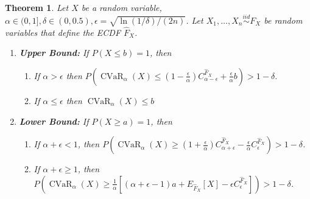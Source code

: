 \documentclass[acmlarge, manuscript, screen, review, natbib=false, oneside]{acmart}
\newtheorem{theorem}{Theorem}[section]
\DeclareMathOperator{\CVaR}{CVaR}
\begin{document}
\begin{theorem}
	\label{prf:ecdf_cvar_bound}
	Let $X$ be a random variable, $\alpha\in (0, 1],\delta \in (0, 0.5), \epsilon=\sqrt{\ln(1/\delta)/(2n)}$. Let $X_1, \dots, X_n \overset{iid}{\sim} F_X$ be random variables that define the ECDF $\hat{F}_X$.
	\begin{enumerate}
		\item \textbf{Upper Bound:} If $P(X\leq b)=1$, then
		\begin{enumerate}
			\item If $\alpha > \epsilon$ then $P(\CVaR_\alpha(X) \leq (1-\frac{\epsilon}{\alpha})C_{\alpha-\epsilon}^{\hat{F}_X} + \frac{\epsilon}{\alpha}b)> 1-\delta$.
			
			\item If $\alpha\leq \epsilon$ then $\CVaR_\alpha(X)\leq b$
		\end{enumerate}
		
		\item \textbf{Lower Bound:} If $P(X\geq a)=1$, then 
		\begin{enumerate}
			\item If $\alpha+\epsilon < 1$, then $P(\CVaR_\alpha(X)\geq (1+\frac{\epsilon}{\alpha})C_{\alpha+\epsilon}^{\hat{F}_X}-\frac{\epsilon}{\alpha}C_{\epsilon}^{\hat{F}_X})> 1-\delta$.
			
			\item If $\alpha+\epsilon \geq 1$, then $P(\CVaR_\alpha(X) \geq \frac{1}{\alpha}[(\alpha+\epsilon - 1)a + E_{\hat{F}_X}[X] - \epsilon C_\epsilon^{\hat{F}_X}]) > 1-\delta$.
		\end{enumerate}
	\end{enumerate}
\end{theorem}
\end{document}
